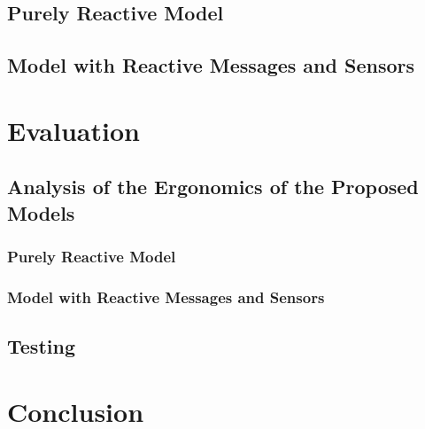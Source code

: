 \documentclass[12pt,a4paper,openright,twoside]{book}
\begin{document}
\section{Purely Reactive Model}

\section{Model with Reactive Messages and Sensors}

\chapter{Evaluation}
\label{chap:evaluation}

\section{Analysis of the Ergonomics of the Proposed Models}

\subsection{Purely Reactive Model}

\subsection{Model with Reactive Messages and Sensors}

\section{Testing}

\chapter{Conclusion}
\label{chap:conclusion}



\backmatter

\nocite{*} %



\end{document}
